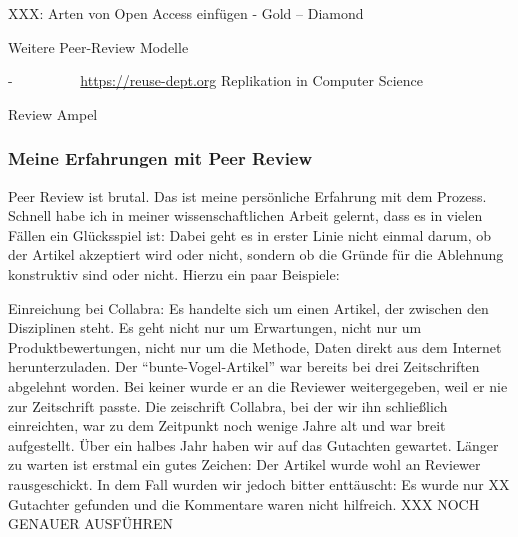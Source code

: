 \documentclass[
  letterpaper,
  DIV=11,
  numbers=noendperiod]{scrreprt}
\begin{document}
XXX: Arten von Open Access einfügen - Gold -- Diamond

Weitere Peer-Review Modelle

-~~~~~~~~~ \url{https://reuse-dept.org} Replikation in Computer Science

Review Ampel

\subsubsection{Meine Erfahrungen mit Peer
Review}\label{meine-erfahrungen-mit-peer-review}

Peer Review ist brutal. Das ist meine persönliche Erfahrung mit dem
Prozess. Schnell habe ich in meiner wissenschaftlichen Arbeit gelernt,
dass es in vielen Fällen ein Glücksspiel ist: Dabei geht es in erster
Linie nicht einmal darum, ob der Artikel akzeptiert wird oder nicht,
sondern ob die Gründe für die Ablehnung konstruktiv sind oder nicht.
Hierzu ein paar Beispiele:

Einreichung bei Collabra: Es handelte sich um einen Artikel, der
zwischen den Disziplinen steht. Es geht nicht nur um Erwartungen, nicht
nur um Produktbewertungen, nicht nur um die Methode, Daten direkt aus
dem Internet herunterzuladen. Der ``bunte-Vogel-Artikel'' war bereits
bei drei Zeitschriften abgelehnt worden. Bei keiner wurde er an die
Reviewer weitergegeben, weil er nie zur Zeitschrift passte. Die
zeischrift Collabra, bei der wir ihn schließlich einreichten, war zu dem
Zeitpunkt noch wenige Jahre alt und war breit aufgestellt. Über ein
halbes Jahr haben wir auf das Gutachten gewartet. Länger zu warten ist
erstmal ein gutes Zeichen: Der Artikel wurde wohl an Reviewer
rausgeschickt. In dem Fall wurden wir jedoch bitter enttäuscht: Es wurde
nur XX Gutachter gefunden und die Kommentare waren nicht hilfreich. XXX
NOCH GENAUER AUSFÜHREN
\end{document}
